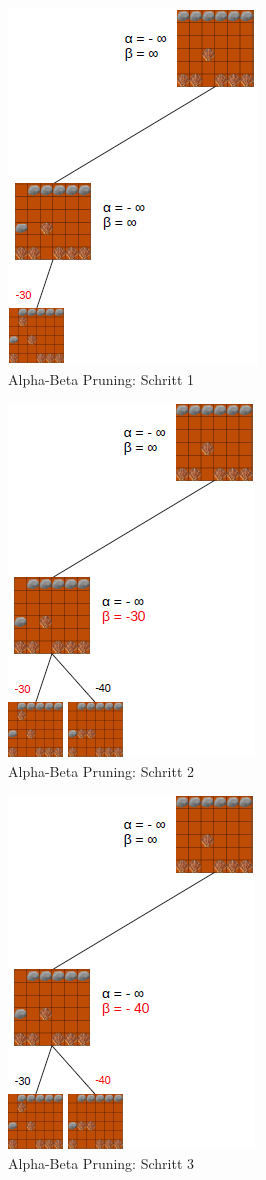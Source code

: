 \begin{figure}[h]
	\centering
	\includegraphics{img/ab1}
	\caption{Alpha-Beta Pruning: Schritt 1}
	\label{fig:ab1}
\end{figure}

\begin{figure}[h]
	\centering
	\includegraphics{img/ab2}
	\caption{Alpha-Beta Pruning: Schritt 2}
	\label{fig:ab2}
\end{figure}

\begin{figure}[h]
	\centering
	\includegraphics{img/ab3}
	\caption{Alpha-Beta Pruning: Schritt 3}
	\label{fig:ab3}
\end{figure}

